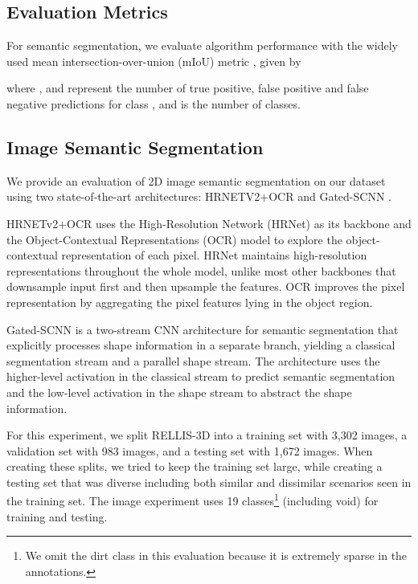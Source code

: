 \documentclass[letterpaper, 10 pt, conference]{ieeeconf}
\begin{document}
 \subsection{Evaluation Metrics}
For semantic segmentation, we evaluate algorithm performance with the widely used mean intersection-over-union (mIoU) metric \cite{Everingham2014}, given by

where ,  and  represent the number of true positive, false positive and false negative predictions for class , and  is the number of classes.

\subsection{Image Semantic Segmentation}
We provide an evaluation of 2D image semantic segmentation on our dataset using two state-of-the-art architectures: HRNETV2+OCR \cite{WangSCJDZLMTWLX19, Yuan2019} and Gated-SCNN \cite{Takikawa2019}.

 HRNETv2+OCR uses the High-Resolution Network (HRNet)\cite{WangSCJDZLMTWLX19} as its backbone and the Object-Contextual Representations (OCR) model \cite{Yuan2019} to explore the object-contextual representation of each pixel. HRNet maintains high-resolution representations throughout the whole model, unlike most other backbones that downsample input first and then upsample the features. OCR improves the pixel representation by aggregating the pixel features lying in the object region. 

Gated-SCNN\cite{Takikawa2019} is a two-stream CNN architecture for semantic segmentation that explicitly processes shape information in a separate branch, yielding a classical segmentation stream and a parallel shape stream. The architecture uses the higher-level activation in the classical stream to predict semantic segmentation and the low-level activation in the shape stream to abstract the shape information.

For this experiment, we split RELLIS-3D into a training set with 3,302 images, a validation set with 983 images, and a testing set with 1,672 images. When creating these splits, we tried to keep the training set large, while creating a testing set that was diverse including both similar and dissimilar scenarios seen in the training set. The image experiment uses 19 classes\footnote{We omit the dirt class in this evaluation because it is extremely sparse in the annotations.} (including void) for training and testing.
\end{document}
